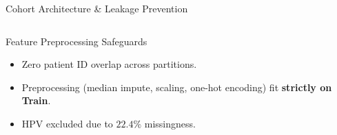 \documentclass[10pt,aspectratio=169,xcolor={table,dvipsnames}]{beamer}
\begin{document}
\begin{frame}{Cohort Architecture \& Leakage Prevention}
\begin{columns}[c]
      \begin{exampleblock}{Feature Preprocessing Safeguards}
        \begin{itemize}\setlength{\itemsep}{1pt}
          \item Zero patient ID overlap across partitions.
          \item Preprocessing (median impute, scaling, one-hot encoding) fit \textbf{strictly on Train}.
          \item HPV excluded due to $22.4\%$ missingness.
        \end{itemize}
      \end{exampleblock}
  \end{columns}
\end{frame}

\end{document}
